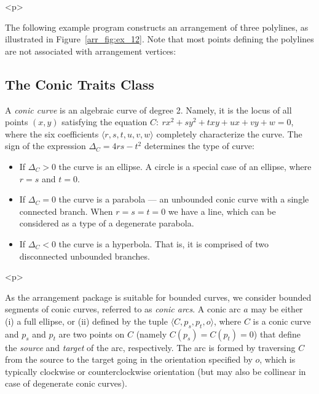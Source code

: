 \begin{ccHtmlOnly}<p>\end{ccHtmlOnly}
The following example program constructs an arrangement of three
polylines, as illustrated in Figure~\ref{arr_fig:ex_12}. Note that
most points defining the polylines are not associated with arrangement
vertices:


\subsection{The Conic Traits Class}
\label{arr_ssec:tr_conic}
%
A {\em conic curve} is an algebraic curve of degree 2. Namely, it
is the locus of all points $(x,y)$ satisfying the equation $C:\ r
x^2 + s y^2 + t xy + u x + v y + w = 0$, where the six
coefficients $\langle r, s, t, u, v, w \rangle$ completely
characterize the curve. The sign of the expression $\Delta_{C} = 4
r s - t^2$ determines the type of curve:
\begin{itemize}
\item If $\Delta_{C} > 0$ the curve is an ellipse. A circle is a
special case of an ellipse, where $r = s$ and $t = 0$.
%
\item If $\Delta_{C} = 0$ the curve is a parabola --- an unbounded
conic curve with a single connected branch. When $r = s = t = 0$
we have a line, which can be considered as a type of a degenerate
parabola.
%
\item If $\Delta_{C} < 0$ the curve is a hyperbola. That is, it
is comprised of two disconnected unbounded branches.
\end{itemize}

\begin{ccHtmlOnly}<p>\end{ccHtmlOnly}
As the arrangement package is suitable for bounded curves, we
consider bounded segments of conic curves, referred to as {\em
conic arcs}. A conic arc $a$ may be either (i) a full ellipse, or
(ii) defined by the tuple $\langle C, p_s, p_t, o \rangle$, where
$C$ is a conic curve and $p_s$ and $p_t$ are two points on $C$
(namely $C(p_s) = C(p_t) = 0$) that define the {\em source} and
{\em target} of the arc, respectively. The arc is formed by
traversing $C$ from the source to the target going in the
orientation specified by $o$, which is typically clockwise or
counterclockwise orientation (but may also be collinear in case of
degenerate conic curves).

